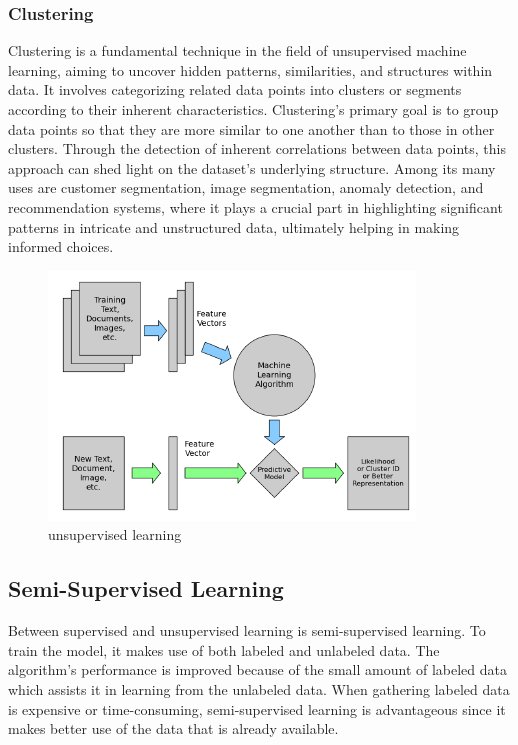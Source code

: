 \documentclass[a4paper,12pt]{report}%
\renewcommand{\\}{\vspace*{0.5\baselineskip} \newline}
\begin{document}
\subsubsection{Clustering}
Clustering is a fundamental technique in the field of unsupervised machine learning, aiming to uncover hidden patterns, similarities, and structures within data. It involves categorizing related data points into clusters or segments according to their inherent characteristics. Clustering's primary goal is to group data points so that they are more similar to one another than to those in other clusters. Through the detection of inherent correlations between data points, this approach can shed light on the dataset's underlying structure. Among its many uses are customer segmentation, image segmentation, anomaly detection, and recommendation systems, where it plays a crucial part in highlighting significant patterns in intricate and unstructured data, ultimately helping in making informed choices.

\begin{figure}[h]
\centering
	\includegraphics[scale=1.5]{images/unsupervised learning.png}\\
	\begin{footnotesize}
		\caption{unsupervised learning\cite{42}}
		\label{unsupervised learning}
	\end{footnotesize}
\end{figure}


\subsection{Semi-Supervised Learning}
Between supervised and unsupervised learning is semi-supervised learning. To train the model, it makes use of both labeled and unlabeled data. The algorithm's performance is improved because of the small amount of labeled data which assists it in learning from the unlabeled data. When gathering labeled data is expensive or time-consuming, semi-supervised learning is advantageous since it makes better use of the data that is already available.
\end{document}
